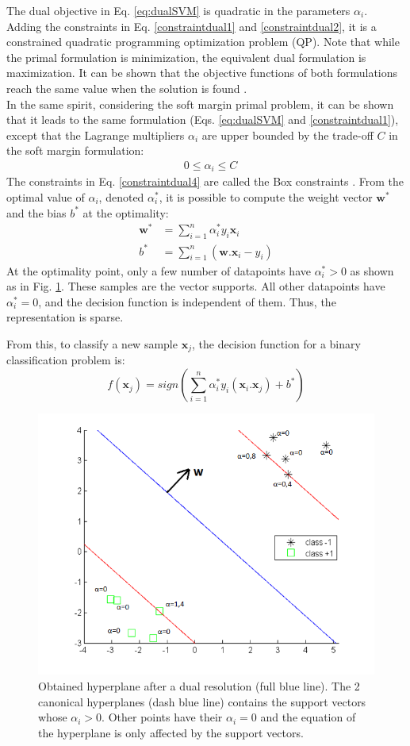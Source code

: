 \noindent The dual objective in Eq. \ref{eq:dualSVM} is quadratic in the parameters $\alpha_i$. Adding the constraints in Eq. \ref{constraintdual1} and \ref{constraintdual2}, it is a constrained quadratic programming optimization problem (QP). Note that while the primal formulation is minimization, the equivalent dual formulation is maximization. It can be shown that the objective functions of both formulations reach the same value when the solution is found \cite{Campbell2011}. \\
In the same spirit, considering the soft margin primal problem, it can be shown that it leads to the same formulation \cite{Campbell2011} (Eqs. \ref{eq:dualSVM} and \ref{constraintdual1}), except that 
the Lagrange multipliers $\alpha_i$ are upper bounded by the trade-off $C$ in the soft margin formulation:
\begin{align}
	& 0 \leq \alpha_i \leq C  \label{constraintdual4}
\end{align}
The constraints in Eq. \ref{constraintdual4} are called the Box constraints \cite{Campbell2011}. From the optimal value of $\alpha_i$, denoted $\alpha_i^*$, it is possible to compute the weight vector $\textbf{w}^*$ and the bias $b^*$ at the optimality:
\begin{align}
	\textbf{w}^* & = \sum\limits_{i=1}^{n}\alpha_i^* y_i \textbf{x}_i \\
	b^* & = \sum\limits_{i=1}^{n} (\textbf{w}.\textbf{x}_i - y_i)
\end{align}
At the optimality point, only a few number of datapoints have $\alpha_i^* > 0$ as shown as in Fig. \ref{fig:SVM_SV}. These samples are the vector supports. All other datapoints have $\alpha_i^*=0$, and the decision function is independent of them. Thus, the representation is sparse. 

\noindent From this, to classify a new sample $\textbf{x}_j$, the decision function for a binary classification problem is:
\begin{equation}
	f(\textbf{x}_j) = sign(\sum\limits_{i=1}^{n} \alpha_i^*y_i(\textbf{x}_i.\textbf{x}_j) + b^*) \label{decisionDual}
\end{equation} 

\begin{figure}[h!]
\centering
\includegraphics[width=0.6\linewidth]{images/SVM_SV2}
\caption{Obtained hyperplane after a dual resolution (full blue line). The 2 canonical hyperplanes (dash blue line) contains the support vectors whose $\alpha_i > 0$. Other points have their $\alpha_i = 0$ and the equation of the hyperplane is only affected by the support vectors.}
\label{fig:SVM_SV}
\end{figure}


